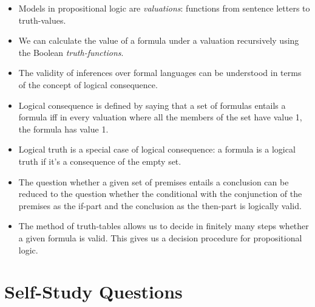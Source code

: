 \begin{itemize}

	\item Models in propositional logic are \emph{valuations}: functions from sentence letters to truth-values.
	
	\item We can calculate the value of a formula under a valuation recursively using the Boolean \emph{truth-functions}.
	
	\item The validity of inferences over formal languages can be understood in terms of the concept of logical consequence.
	
	\item Logical consequence is defined by saying that a set of formulas entails a formula iff in every valuation where all the members of the set have value 1, the formula has value 1.
	
	\item Logical truth is a special case of logical consequence: a formula is a logical truth if it's a consequence of the empty set.
	
	\item The question whether a given set of premises entails a conclusion can be reduced to the question whether the conditional with the conjunction of the premises as the if-part and the conclusion as the then-part is logically valid.
		
	\item The method of truth-tables allows us to decide in finitely many steps whether a given formula is valid. This gives us a decision procedure for propositional logic.
	
\end{itemize}

\section{Self-Study Questions}


